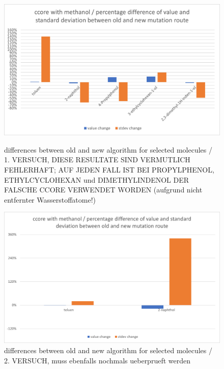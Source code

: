 \begin{figure}[H]
	
	\includegraphics[scale=0.8]{molecules_v1_failed_barchart}
		
	
	{differences between old and new algorithm for selected molecules / 1. VERSUCH, DIESE RESULTATE SIND VERMUTLICH FEHLERHAFT; AUF JEDEN FALL IST BEI PROPYLPHENOL, ETHYLCYCLOHEXAN und DIMETHYLINDENOL DER FALSCHE CCORE VERWENDET WORDEN (aufgrund nicht entfernter Wasserstoffatome!)}
	
	\includegraphics[scale=0.8]{2molecules_v2_barchart}
	
	
	\caption{differences between old and new algorithm for selected molecules / 2. VERSUCH, muss ebenfalls nochmals ueberprueft werden}
	
\end{figure}


